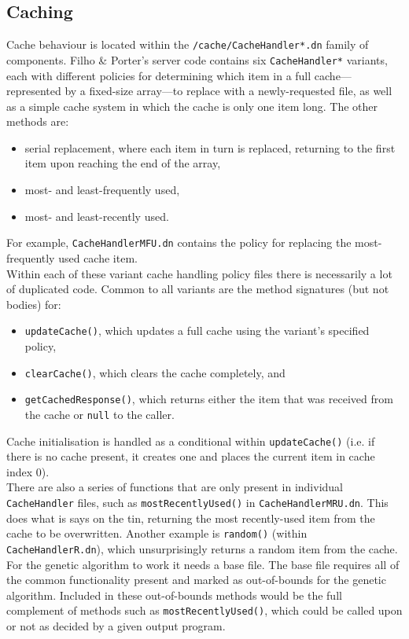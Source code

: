 \documentclass[compsoc,12pt,a4paper]{IEEEtran}
\begin{document}
		\subsection{Caching}
		\label{sec:caching}
		
			Cache behaviour is located within the \lstinline|/cache/CacheHandler*.dn| family of components. Filho \& Porter's server code contains six \lstinline|CacheHandler*| variants, each with different policies for determining which item in a full cache---represented by a fixed-size array---to replace with a newly-requested file, as well as a simple cache system in which the cache is only one item long. The other methods are:
			\begin{itemize}
				\item serial replacement, where each item in turn is replaced, returning to the first item upon reaching the end of the array,
				\item most- and least-frequently used,
				\item most- and least-recently used. 
			\end{itemize}
			For example, \lstinline|CacheHandlerMFU.dn| contains the policy for replacing the most-frequently used cache item.\\
			Within each of these variant cache handling policy files there is necessarily a lot of duplicated code. Common to all variants are the method signatures (but not bodies) for:
			\begin{itemize}
				\item \lstinline|updateCache()|, which updates a full cache using the variant's specified policy,
				\item \lstinline|clearCache()|, which clears the cache completely, and
				\item \lstinline|getCachedResponse()|, which returns either the item that was received from the cache or \lstinline|null| to the caller.
			\end{itemize}
			Cache initialisation is handled as a conditional within \lstinline|updateCache()| (i.e. if there is no cache present, it creates one and places the current item in cache index 0).\\
			There are also a series of functions that are only present in individual \lstinline|CacheHandler| files, such as \lstinline|mostRecentlyUsed()| in \lstinline|CacheHandlerMRU.dn|. This does what is says on the tin, returning the most recently-used item from the cache to be overwritten. Another example is \lstinline|random()| (within \lstinline|CacheHandlerR.dn|), which unsurprisingly returns a random item from the cache.\\
			For the genetic algorithm to work it needs a base file. The base file requires all of the common functionality present and marked as out-of-bounds for the genetic algorithm. Included in these out-of-bounds methods would be the full complement of methods such as \lstinline|mostRecentlyUsed()|, which could be called upon or not as decided by a given output program.
		
\end{document}
